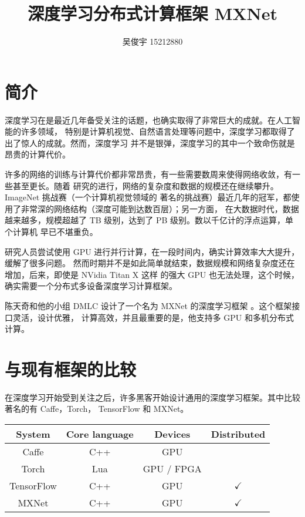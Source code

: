 \documentclass{ctexart}
\title{深度学习分布式计算框架 MXNet}
\author{吴俊宇 15212880}
\begin{document}
\date{}
\maketitle
\tableofcontents
\pagebreak

\section{简介}

深度学习在是最近几年备受关注的话题，也确实取得了非常巨大的成就。在人工智能的许多领域，
特别是计算机视觉、自然语言处理等问题中，深度学习都取得了出了惊人的成就。然而，深度学习
并不是银弹，深度学习的其中一个致命伤就是昂贵的计算代价。

许多的网络的训练与计算代价都非常昂贵，有一些需要数周来使得网络收敛，有一些甚至更长。随着
研究的进行，网络的复杂度和数据的规模还在继续攀升。ImageNet 挑战赛（一个计算机视觉领域的
著名的挑战赛）最近几年的冠军，都使用了非常深的网络结构（深度可能到达数百层）；另一方面，
在大数据时代，数据越来越多，规模超越了 TB 级别，达到了 PB 级别。数以千亿计的浮点运算，单个计算机
早已不堪重负。

研究人员尝试使用 GPU 进行并行计算，在一段时间内，确实计算效率大大提升，缓解了很多问题。
然而时期并不是如此简单就结束，数据规模和网络复杂度还在增加，后来，即使是 NVidia Titan X 这样
的强大 GPU 也无法处理，这个时候，确实需要一个分布式多设备深度学习计算框架。

陈天奇和他的小组 DMLC 设计了一个名为 MXNet 的深度学习框架 \cite{this-paper}。这个框架接口灵活，设计优雅，
计算高效，并且最重要的是，他支持多 GPU 和多机分布式计算。

\section{与现有框架的比较}

在深度学习开始受到关注之后，许多黑客开始设计通用的深度学习框架。其中比较著名的有 Caffe，Torch，
TensorFlow 和 MXNet。

\vfill
\begin{tabular}{|c|c|c|c|}
	\hline \rule[-2ex]{0pt}{5.5ex} System & Core language & Devices & Distributed \\ 
	\hline \rule[-2ex]{0pt}{5.5ex} Caffe & C++ & GPU &  \\ 
	\hline \rule[-2ex]{0pt}{5.5ex} Torch & Lua & GPU / FPGA &  \\ 
	\hline \rule[-2ex]{0pt}{5.5ex} TensorFlow & C++ & GPU & $\checkmark$ \\ 
	\hline \rule[-2ex]{0pt}{5.5ex} MXNet & C++ & GPU & $\checkmark$ \\ 
	\hline 
\end{tabular}
\vfill
\end{document}

